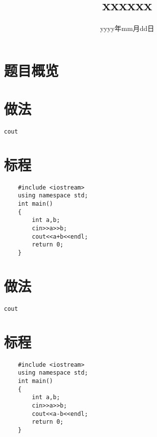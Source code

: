 \documentclass{ctsol}
\title{xxxxxx}
\date{yyyy年mm月dd日}
\begin{document}
\maketitle
{}

\section*{题目概览}
\solutiontab

\makesolution
\section*{做法}
\verb|cout|

\section*{标程}
\begin{lstlisting}
    #include <iostream>
    using namespace std;
    int main()
    {
        int a,b;
        cin>>a>>b;
        cout<<a+b<<endl;
        return 0;
    }
\end{lstlisting}

\makesolution
\section*{做法}
\verb|cout|

\section*{标程}
\begin{lstlisting}
    #include <iostream>
    using namespace std;
    int main()
    {
        int a,b;
        cin>>a>>b;
        cout<<a-b<<endl;
        return 0;
    }
\end{lstlisting}
\end{document}
